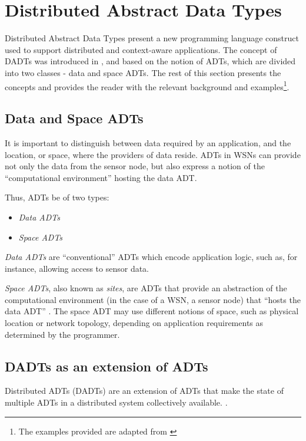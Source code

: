 \section {Distributed Abstract Data Types} \label{sec:DADT}

Distributed Abstract Data Types present a new programming language construct
used to support distributed and context-aware applications. The concept of DADTs was
introduced in \cite{migliavacca_DADT:2006}, and based on the notion of ADTs,
which are divided into two classes - data and space ADTs. 
The rest of this section presents the concepts and provides the reader with the
relevant background and examples\footnote{The examples provided are adapted from \cite{migliavacca_DADT:2006}}.

\subsection{Data and Space ADTs} \label{subsubsec:DataAndSpaceADTs}

It is important to distinguish between data required by an application, and
the location, or space, where the providers of data reside. ADTs in WSNs can
provide not only the data from the sensor node, but also express a notion
of the ``computational environment'' hosting the data ADT.

Thus, ADTs be of two types:

\begin{itemize}
  \item \emph{Data ADTs}
  \item \emph{Space ADTs} 
\end{itemize}

\emph{Data ADTs} are ``conventional'' ADTs which encode application logic, such
as, for instance, allowing access to sensor data.

\emph{Space ADTs}, also known as \emph{sites}, are ADTs that provide an
abstraction of the computational environment (in the case of a WSN, a sensor
node) that ``hosts the data ADT'' \cite{migliavacca_DADT:2006}. The space ADT may
use different notions of space, such as physical location or network topology,
depending on application requirements as determined by the programmer.

\subsection{DADTs as an extension of ADTs} \label{subsec:DADTsConcepts}
Distributed ADTs (DADTs) are an extension of ADTs that make the state of multiple ADTs in a
distributed system collectively available.
\cite{migliavacca_DADT:2006}. 

